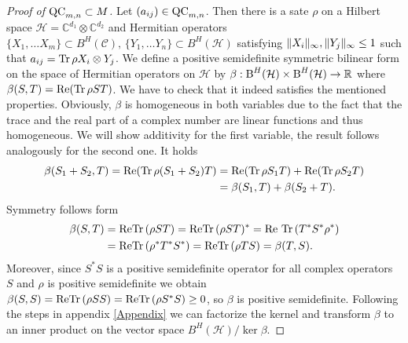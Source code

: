 \begin{proof}[Proof of $ \textup{QC}_{m,n} \subset M $]
	Let $ (a_{ij}) \in \textup{QC}_{m,n} $. Then there is a sate $ \rho $ on a Hilbert space $ \mathcal{H} = \mathbb{C}^{d_1} \otimes\mathbb{C}^{d_2} $ and Hermitian operators $ \{X_1,\hdots X_m\}\subset  B^H(\mathcal{C}), \, \{Y_1,\hdots Y_n\}\subset B^H(\mathcal{H}) $ satisfying $  \Vert {X_i} \Vert_{\infty},  \Vert {Y_j} \Vert_{\infty} \le 1 $ such that 
	$ a_{ij} = \text{Tr} \, {\rho X_i \otimes Y_j}  $.
	We define a positive semidefinite symmetric bilinear form on the space of Hermitian operators on $ \mathcal{H} $ by 
	$ \beta: \textup{B}^{H}(\mathcal{H}) \times \textup{B}^{H}(\mathcal{H}) \to \mathbb{R} $ where $ \beta(S,T) =\textup{Re}( \text{Tr} \, {\rho ST} ) $.
	We have to check that it indeed satisfies the mentioned properties. 
	Obviously, $ \beta $ is homogeneous in both variables due to the fact that the trace and the real part of a complex number are linear functions and thus homogeneous. We will show additivity for the first variable, the result follows analogously for the second one. It holds
	\begin{align*}
		\beta(S_1+S_2,T) = \textup{Re}(\text{Tr} \, {\rho(S_1+S_2)T} ) &= \textup{Re}(\text{Tr} \, {\rho S_1T} ) + \textup{Re}(\text{Tr} \, {\rho S_2T} ) \\
		&= \beta(S_1,T)+ \beta(S_2+T).
	\end{align*}
	Symmetry follows form 
	\begin{align*}
		\beta(S,T)&= \textup{Re}\text{Tr} \, {(\rho ST)}  =\textup{Re}\text{Tr} \, {(\rho ST)^*}   = \textup{Re \ensuremath{\text{Tr} \, {(T^*S^* \rho^*} })}  \\
		 &=\textup{Re} \text{Tr} \, {(\rho^* T^*S^*)}  = \textup{Re} \text{Tr} \, {(\rho T S)}  = \beta(T,S).
	\end{align*}
	Moreover, since $ S^*S $ is a positive semidefinite operator for all complex operators $ S $ and $  \rho $ is positive semidefinite we obtain $ \beta(S,S) = \textup{Re}\text{Tr} \, {(\rho SS)}  = \textup{Re} \text{Tr} \, {(\rho S^*S)}  \ge 0 $, so $ \beta $ is positive semidefinite. 
	Following the steps in appendix \ref{Appendix} we can factorize the kernel and transform $ \beta $ to an inner product on the vector space $ B^H(\mathcal{H})/ \ker{\beta} $. 
	

\end{proof}
